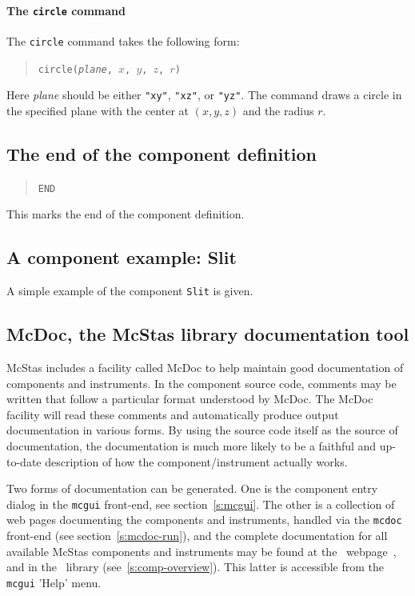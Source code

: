 \paragraph{The {\tt circle} command}

The {\tt circle} command takes the following form:
\begin{quote}
  \texttt{circle({\it plane}, $x$, $y$, $z$, $r$)}
\end{quote}
Here {\it plane} should be either \verb+"xy"+, \verb+"xz"+, or
\verb+"yz"+. The command draws a circle in the specified plane with the center
 at $(x, y, z)$ and the radius $r$.



\subsection{The end of the component definition}

\begin{quote}
  \texttt{END}
\end{quote}
This marks the end of the component definition.

\subsection{A component example: Slit}
\label{s:slit}
A simple example of the component \texttt{Slit} is given.



\subsection{McDoc, the McStas library documentation tool}
\label{s:mcdoc}

McStas includes a facility called McDoc to help maintain good documentation of
components and instruments. In the component source code, comments may be
written that follow a particular format understood by McDoc. The McDoc facility
will read these comments and automatically produce output documentation in
various forms. By using the source code itself as the source of documentation,
the documentation is much more likely to be a faithful and up-to-date
description of how the component/instrument actually works.

Two forms of documentation can be generated. One
is the component entry dialog in the \verb+mcgui+ front-end, see
section~\ref{s:mcgui}. The other is a collection of web pages documenting
the components and instruments, handled via the \verb+mcdoc+ front-end (see section~\ref{s:mcdoc-run}), and the complete documentation for all available
McStas components and instruments may be found at the \MCS\
webpage~\cite{mcstas_webpage}, and in the \MCS\ library (see~\ref{s:comp-overview}). This latter is accessible from the \verb+mcgui+ 'Help' menu.

